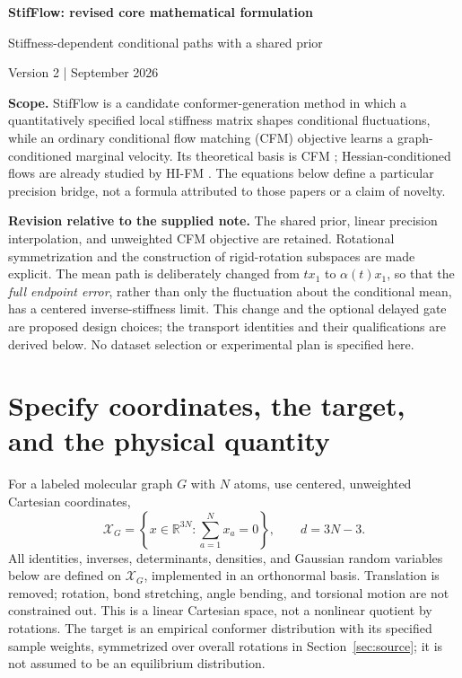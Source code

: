 \documentclass[11pt,letterpaper]{article}
\newcommand{\R}{\mathbb R}
\newcommand{\X}{\mathcal X_G}
\begin{document}
\thispagestyle{plain}
\begin{center}
{\LARGE\bfseries StifFlow: revised core mathematical formulation}\par
\vspace{5pt}
{\large Stiffness-dependent conditional paths with a shared prior}\par
\vspace{4pt}
{\small Version 2 \quad |  September 2026}
\end{center}

\textbf{Scope.} StifFlow is a candidate conformer-generation method in which a quantitatively specified local stiffness matrix shapes conditional fluctuations, while an ordinary conditional flow matching (CFM) objective learns a graph-conditioned marginal velocity. Its theoretical basis is CFM \cite{lipman}; Hessian-conditioned flows are already studied by HI-FM \cite{sprague}. The equations below define a particular precision bridge, not a formula attributed to those papers or a claim of novelty.

\textbf{Revision relative to the supplied note.} The shared prior, linear precision interpolation, and unweighted CFM objective are retained. Rotational symmetrization and the construction of rigid-rotation subspaces are made explicit. The mean path is deliberately changed from $t x_1$ to $\alpha(t)x_1$, so that the \emph{full endpoint error}, rather than only the fluctuation about the conditional mean, has a centered inverse-stiffness limit. This change and the optional delayed gate are proposed design choices; the transport identities and their qualifications are derived below. No dataset selection or experimental plan is specified here.

\section{Specify coordinates, the target, and the physical quantity}

For a labeled molecular graph $G$ with $N$ atoms, use centered, unweighted Cartesian coordinates,
\begin{equation}\label{eq:space}
\X=\left\{x\in\R^{3N}:\sum_{a=1}^{N}x_a=0\right\},
\qquad d=3N-3.
\end{equation}
All identities, inverses, determinants, densities, and Gaussian random variables below are defined on $\X$, implemented in an orthonormal basis. Translation is removed; rotation, bond stretching, angle bending, and torsional motion are not constrained out. This is a linear Cartesian space, not a nonlinear quotient by rotations. The target is an empirical conformer distribution with its specified sample weights, symmetrized over overall rotations in Section~\ref{sec:source}; it is not assumed to be an equilibrium distribution.
\end{document}
